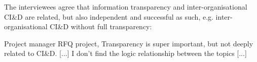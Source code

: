%
%
%
%
%
%
%
%
 The interviewees agree that %
information transparency and inter-organisational CI\&D are related, %
but also independent and successful as such, e.g. inter-organisational CI\&D without full transparency: 

\begin{aquote}{Project manager RFQ project, \company{}}
 Transparency is super important, but not deeply related to CI\&D. [...] I don't find the logic relationship  between the topics [...] %
\end{aquote}

